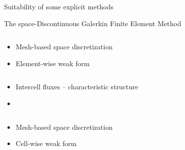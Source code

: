 \begin{withoutheadline}
  \begin{frame}{Suitability of some explicit methods}
    
    \begin{block}{The space-Discontinuous Galerkin Finite Element Method \cite{Cockburn}}
      \vspace{-0.2cm}
      \begin{overprint}
        \vspace{-0.2cm}
        \begin{columns}
          \begin{footnotesize}
            \begin{column}{0.4\textwidth}
              \begin{itemize}
              \item[] Mesh-based space discretization
              \item[] Element-wise weak form \cite{NeutronDG}
              \end{itemize}
            \end{column}
            \begin{column}{0.6\textwidth}
              \begin{itemize}
              \item[] Intercell fluxes -- characteristic structure
              \item[] %
              \end{itemize}
            \end{column}
          \end{footnotesize}
        \end{columns}
        \vspace{3.65cm}
        \vspace{-0.2cm}
        \begin{columns}
          \begin{footnotesize}
            \begin{column}{0.4\textwidth}
              \begin{itemize}
              \item[] Mesh-based space discretization
              \item[] Cell-wise weak form \cite{NeutronDG}
              \end{itemize}
            \end{column}
            \begin{column}{0.6\textwidth}

\end{column}
\end{footnotesize}
\end{columns}
\end{overprint}
\end{block}
\end{frame}
\end{withoutheadline}
